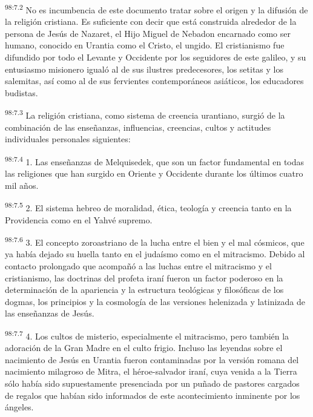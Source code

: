 \par
\textsuperscript{98:7.2} No es incumbencia de este documento tratar sobre el origen y la difusión de la religión cristiana. Es suficiente con decir que está construida alrededor de la persona de Jesús de Nazaret, el Hijo Miguel de Nebadon encarnado como ser humano, conocido en Urantia como el Cristo, el ungido. El cristianismo fue difundido por todo el Levante y Occidente por los seguidores de este galileo, y su entusiasmo misionero igualó al de sus ilustres predecesores, los setitas y los salemitas, así como al de sus fervientes contemporáneos asiáticos, los educadores budistas.

\par
\textsuperscript{98:7.3} La religión cristiana, como sistema de creencia urantiano, surgió de la combinación de las enseñanzas, influencias, creencias, cultos y actitudes individuales personales siguientes:

\par
\textsuperscript{98:7.4} 1. Las enseñanzas de Melquisedek, que son un factor fundamental en todas las religiones que han surgido en Oriente y Occidente durante los últimos cuatro mil años.

\par
\textsuperscript{98:7.5} 2. El sistema hebreo de moralidad, ética, teología y creencia tanto en la Providencia como en el Yahvé supremo.

\par
\textsuperscript{98:7.6} 3. El concepto zoroastriano de la lucha entre el bien y el mal cósmicos, que ya había dejado su huella tanto en el judaísmo como en el mitracismo. Debido al contacto prolongado que acompañó a las luchas entre el mitracismo y el cristianismo, las doctrinas del profeta iraní fueron un factor poderoso en la determinación de la apariencia y la estructura teológicas y filosóficas de los dogmas, los principios y la cosmología de las versiones helenizada y latinizada de las enseñanzas de Jesús.

\par
\textsuperscript{98:7.7} 4. Los cultos de misterio, especialmente el mitracismo, pero también la adoración de la Gran Madre en el culto frigio. Incluso las leyendas sobre el nacimiento de Jesús en Urantia fueron contaminadas por la versión romana del nacimiento milagroso de Mitra, el héroe-salvador iraní, cuya venida a la Tierra sólo había sido supuestamente presenciada por un puñado de pastores cargados de regalos que habían sido informados de este acontecimiento inminente por los ángeles.

